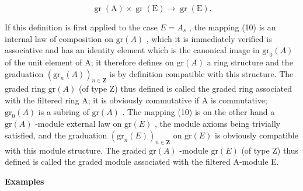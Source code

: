 \[
\operatorname{gr} (\mathrm{A}) \times \operatorname{gr} (\mathrm{E}) \rightarrow \operatorname{gr} (\mathrm{E}).\tag{10}
\]

If this definition is first applied to the case \(E = A_{s}\) , the mapping (10) is an internal law of composition on \(\mathrm{gr}(A)\) , which it is immediately verified is associative and has an identity element which is the canonical image in \(\mathrm{gr}_{0}(A)\) of the unit element of A; it therefore defines on \(\mathrm{gr}(A)\) a ring structure and the graduation \((\mathrm{gr}_{n}(A))_{n\in\mathbf{Z}}\) is by definition compatible with this structure. The graded ring \(\mathrm{gr}(A)\) (of type Z) thus defined is called the graded ring associated with the filtered ring A; it is obviously commutative if A is commutative; \(\mathrm{gr}_{0}(A)\) is a subring of \(\mathrm{gr}(A)\) . The mapping (10) is on the other hand a \(\mathrm{gr}(A)\) -module external law on \(\mathrm{gr}(E)\) , the module axioms being trivially satisfied, and the graduation \((\mathrm{gr}_{n}(E))_{n\in\mathbf{Z}}\) on \(\mathrm{gr}(E)\) is obviously compatible with this module structure. The graded \(\mathrm{gr}(A)\) -module \(\mathrm{gr}(E)\) (of type Z) thus defined is called the graded module associated with the filtered A-module E.

\textbf{Examples}\par


